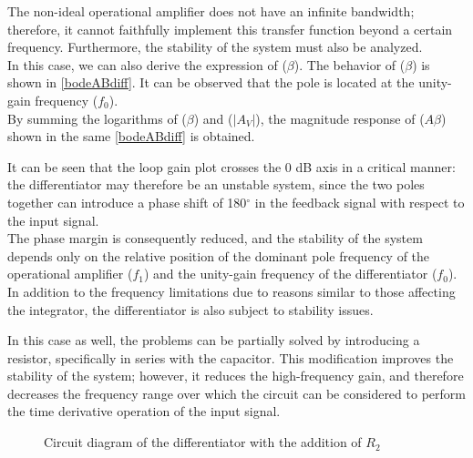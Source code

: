 \documentclass[../main.tex]{subfiles}
\begin{document}
The non-ideal operational amplifier does not have an infinite bandwidth; therefore, it cannot faithfully implement this transfer function beyond a certain frequency. Furthermore, the stability of the system must also be analyzed.\\

In this case, we can also derive the expression of ($\beta$). The behavior of ($\beta$) is shown in \autoref{bodeABdiff}. It can be observed that the pole is located at the unity-gain frequency ($f_0$).\\

By summing the logarithms of ($\beta$) and ($|A_V|$), the magnitude response of ($A\beta$) shown in the same \autoref{bodeABdiff} is obtained. 

It can be seen that the loop gain plot crosses the 0 dB axis in a critical manner: the differentiator may therefore be an unstable system, since the two poles together can introduce a phase shift of 180$^\circ$ in the feedback signal with respect to the input signal.\\

The phase margin is consequently reduced, and the stability of the system depends only on the relative position of the dominant pole frequency of the operational amplifier ($f_1$) and the unity-gain frequency of the differentiator ($f_0$).\\

In addition to the frequency limitations due to reasons similar to those affecting the integrator, the differentiator is also subject to stability issues. 

In this case as well, the problems can be partially solved by introducing a resistor, specifically in series with the capacitor. This modification improves the stability of the system; however, it reduces the high-frequency gain, and therefore decreases the frequency range over which the circuit can be considered to perform the time derivative operation of the input signal.\\



\begin{figure}[h!]
\begin{center}



\caption{Circuit diagram of the differentiator with the addition of $R_2$}	
\label{diffRes}
\end{center}	
\end{figure}
\end{document}
